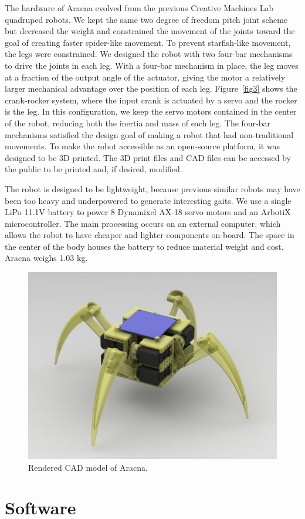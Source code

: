 \documentclass[letterpaper]{article}
\begin{document}
The hardware of Aracna evolved from the previous Creative Machines Lab
quadruped robots. We kept the same two degree of freedom pitch joint
scheme but decreased the weight and constrained the movement of the
joints toward the goal of creating faster spider-like movement. To
prevent starfish-like movement, the legs were constrained. We designed
the robot with two four-bar mechanisms to drive the joints in each
leg. With a four-bar mechanism in place, the leg moves at a fraction
of the output angle of the actuator, giving the motor a relatively
larger mechanical advantage over the position of each leg.
Figure~\ref{fig3} shows the crank-rocker system, where the input crank
is actuated by a servo and the rocker is the leg. In this
configuration, we keep the servo motors contained in the center of the
robot, reducing both the inertia and mass of each leg. The four-bar
mechanisms satisfied the design goal of making a robot that had
non-traditional movements.  To make the robot
accessible as an open-source platform, it was designed to be 3D
printed. The 3D print files and CAD files can be accessed by the
public to be printed and, if desired, modified.

The robot is designed to be lightweight, because previous similar
robots may have been too heavy and underpowered to generate
interesting gaits. We use a single LiPo 11.1V battery to
power 8 Dynamixel AX-18 servo motors and an ArbotiX
microcontroller. The main processing occurs on an external computer,
which allows the robot to have cheaper and lighter components
on-board. The space in the center of the body houses the
battery to reduce material weight and cost. Aracna weighs 1.03 kg.

\begin{figure}[t]
\begin{center}
\includegraphics[width=.37\textwidth]{fig5.jpg}
\caption{Rendered CAD model of Aracna.}
\label{fi52}
\end{center}
\end{figure}



\section{Software}
\end{document}
